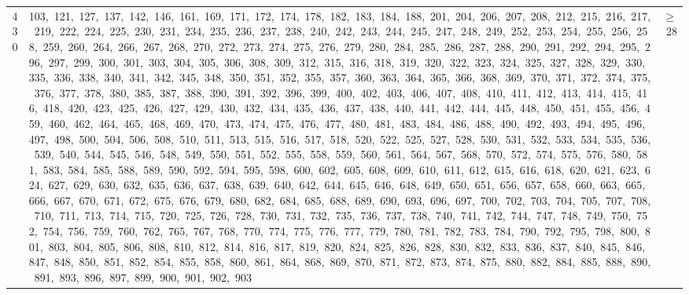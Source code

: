 \begin{longtable}{c|p{}|r}
430 & 103,\ 121,\ 127,\ 137,\ 142,\ 146,\ 161,\ 169,\ 171,\ 172,\ 174,\ 178,\ 182,\ 183,\ 184,\ 188,\ 201,\ 204,\ 206,\ 207,\ 208,\ 212,\ 215,\ 216,\ 217,\ 219,\ 222,\ 224,\ 225,\ 230,\ 231,\ 234,\ 235,\ 236,\ 237,\ 238,\ 240,\ 242,\ 243,\ 244,\ 245,\ 247,\ 248,\ 249,\ 252,\ 253,\ 254,\ 255,\ 256,\ 258,\ 259,\ 260,\ 264,\ 266,\ 267,\ 268,\ 270,\ 272,\ 273,\ 274,\ 275,\ 276,\ 279,\ 280,\ 284,\ 285,\ 286,\ 287,\ 288,\ 290,\ 291,\ 292,\ 294,\ 295,\ 296,\ 297,\ 299,\ 300,\ 301,\ 303,\ 304,\ 305,\ 306,\ 308,\ 309,\ 312,\ 315,\ 316,\ 318,\ 319,\ 320,\ 322,\ 323,\ 324,\ 325,\ 327,\ 328,\ 329,\ 330,\ 335,\ 336,\ 338,\ 340,\ 341,\ 342,\ 345,\ 348,\ 350,\ 351,\ 352,\ 355,\ 357,\ 360,\ 363,\ 364,\ 365,\ 366,\ 368,\ 369,\ 370,\ 371,\ 372,\ 374,\ 375,\ 376,\ 377,\ 378,\ 380,\ 385,\ 387,\ 388,\ 390,\ 391,\ 392,\ 396,\ 399,\ 400,\ 402,\ 403,\ 406,\ 407,\ 408,\ 410,\ 411,\ 412,\ 413,\ 414,\ 415,\ 416,\ 418,\ 420,\ 423,\ 425,\ 426,\ 427,\ 429,\ 430,\ 432,\ 434,\ 435,\ 436,\ 437,\ 438,\ 440,\ 441,\ 442,\ 444,\ 445,\ 448,\ 450,\ 451,\ 455,\ 456,\ 459,\ 460,\ 462,\ 464,\ 465,\ 468,\ 469,\ 470,\ 473,\ 474,\ 475,\ 476,\ 477,\ 480,\ 481,\ 483,\ 484,\ 486,\ 488,\ 490,\ 492,\ 493,\ 494,\ 495,\ 496,\ 497,\ 498,\ 500,\ 504,\ 506,\ 508,\ 510,\ 511,\ 513,\ 515,\ 516,\ 517,\ 518,\ 520,\ 522,\ 525,\ 527,\ 528,\ 530,\ 531,\ 532,\ 533,\ 534,\ 535,\ 536,\ 539,\ 540,\ 544,\ 545,\ 546,\ 548,\ 549,\ 550,\ 551,\ 552,\ 555,\ 558,\ 559,\ 560,\ 561,\ 564,\ 567,\ 568,\ 570,\ 572,\ 574,\ 575,\ 576,\ 580,\ 581,\ 583,\ 584,\ 585,\ 588,\ 589,\ 590,\ 592,\ 594,\ 595,\ 598,\ 600,\ 602,\ 605,\ 608,\ 609,\ 610,\ 611,\ 612,\ 615,\ 616,\ 618,\ 620,\ 621,\ 623,\ 624,\ 627,\ 629,\ 630,\ 632,\ 635,\ 636,\ 637,\ 638,\ 639,\ 640,\ 642,\ 644,\ 645,\ 646,\ 648,\ 649,\ 650,\ 651,\ 656,\ 657,\ 658,\ 660,\ 663,\ 665,\ 666,\ 667,\ 670,\ 671,\ 672,\ 675,\ 676,\ 679,\ 680,\ 682,\ 684,\ 685,\ 688,\ 689,\ 690,\ 693,\ 696,\ 697,\ 700,\ 702,\ 703,\ 704,\ 705,\ 707,\ 708,\ 710,\ 711,\ 713,\ 714,\ 715,\ 720,\ 725,\ 726,\ 728,\ 730,\ 731,\ 732,\ 735,\ 736,\ 737,\ 738,\ 740,\ 741,\ 742,\ 744,\ 747,\ 748,\ 749,\ 750,\ 752,\ 754,\ 756,\ 759,\ 760,\ 762,\ 765,\ 767,\ 768,\ 770,\ 774,\ 775,\ 776,\ 777,\ 779,\ 780,\ 781,\ 782,\ 783,\ 784,\ 790,\ 792,\ 795,\ 798,\ 800,\ 801,\ 803,\ 804,\ 805,\ 806,\ 808,\ 810,\ 812,\ 814,\ 816,\ 817,\ 819,\ 820,\ 824,\ 825,\ 826,\ 828,\ 830,\ 832,\ 833,\ 836,\ 837,\ 840,\ 845,\ 846,\ 847,\ 848,\ 850,\ 851,\ 852,\ 854,\ 855,\ 858,\ 860,\ 861,\ 864,\ 868,\ 869,\ 870,\ 871,\ 872,\ 873,\ 874,\ 875,\ 880,\ 882,\ 884,\ 885,\ 888,\ 890,\ 891,\ 893,\ 896,\ 897,\ 899,\ 900,\ 901,\ 902,\ 903 & $\ge$ 28 \\

\end{longtable}
